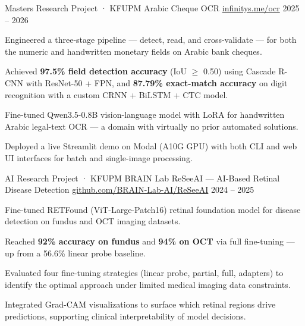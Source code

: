 \begin{cventries}
  \cventry
    {Masters Research Project · KFUPM} %
    {Arabic Cheque OCR} %
    {\href{https://infinitys.me/ocr}{infinitys.me/ocr}} %
    {2025 – 2026} %
    {
      \begin{cvitems}
        \item {Engineered a three-stage pipeline — detect, read, and cross-validate — for both the numeric and handwritten monetary fields on Arabic bank cheques.}
        \item {Achieved \textbf{97.5\% field detection accuracy} (IoU $\geq$ 0.50) using Cascade R-CNN with ResNet-50 + FPN, and \textbf{87.79\% exact-match accuracy} on digit recognition with a custom CRNN + BiLSTM + CTC model.}
        \item {Fine-tuned Qwen3.5-0.8B vision-language model with LoRA for handwritten Arabic legal-text OCR — a domain with virtually no prior automated solutions.}
        \item {Deployed a live Streamlit demo on Modal (A10G GPU) with both CLI and web UI interfaces for batch and single-image processing.}
      \end{cvitems}
    }

  \cventry
    {AI Research Project · KFUPM BRAIN Lab} %
    {ReSeeAI — AI-Based Retinal Disease Detection} %
    {\href{https://github.com/BRAIN-Lab-AI/ReSeeAI-AI-Based-Retinal-Disease-Detection}{github.com/BRAIN-Lab-AI/ReSeeAI}} %
    {2024 – 2025} %
    {
      \begin{cvitems}
        \item {Fine-tuned RETFound (ViT-Large-Patch16) retinal foundation model for disease detection on fundus and OCT imaging datasets.}
        \item {Reached \textbf{92\% accuracy on fundus} and \textbf{94\% on OCT} via full fine-tuning — up from a 56.6\% linear probe baseline.}
        \item {Evaluated four fine-tuning strategies (linear probe, partial, full, adapters) to identify the optimal approach under limited medical imaging data constraints.}
        \item {Integrated Grad-CAM visualizations to surface which retinal regions drive predictions, supporting clinical interpretability of model decisions.}
      \end{cvitems}
    }

\end{cventries}
